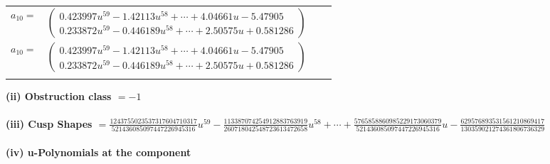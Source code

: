 \documentclass[1p]{elsarticle_modified}
\theoremstyle{definition}
\begin{document}
\begin{tabular}{m{7pt} m{180pt} m{7pt} m{180pt} }
\flushright $a_{10}=$&$\begin{pmatrix}0.423997 u^{59}-1.42113 u^{58}+\cdots+4.04661 u-5.47905\\0.233872 u^{59}-0.446189 u^{58}+\cdots+2.50575 u+0.581286\end{pmatrix}$\\ \flushright $a_{10}=$&$\begin{pmatrix}0.423997 u^{59}-1.42113 u^{58}+\cdots+4.04661 u-5.47905\\0.233872 u^{59}-0.446189 u^{58}+\cdots+2.50575 u+0.581286\end{pmatrix}$\\&\end{tabular}
\flushleft \textbf{(ii) Obstruction class $= -1$}\\~\\
\flushleft \textbf{(iii) Cusp Shapes $= \frac{1243755023537317604710317}{521436085097447226945316} u^{59}-\frac{113387074254912883763919}{260718042548723613472658} u^{58}+\cdots+\frac{5765858860985229173060379}{521436085097447226945316} u-\frac{629576893531561210869417}{130359021274361806736329}$}\\~\\
\newpage\renewcommand{\arraystretch}{1}
\flushleft \textbf{(iv) u-Polynomials at the component}\newline \\
\end{document}
